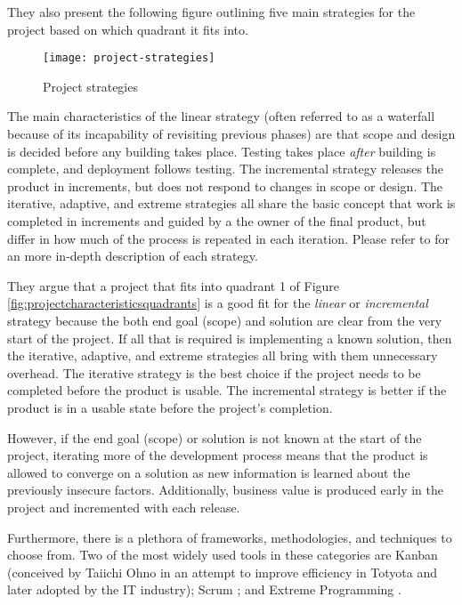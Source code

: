 They also present the following figure outlining five main strategies for the project based on which quadrant it fits into.

\begin{figure}[H]
    \label{fig:projectstrategies}
    \centerline{\texttt{[image: project-strategies]}}
    \caption{Project strategies}
\end{figure}

The main characteristics of the linear strategy (often referred to as a waterfall because of its incapability of revisiting previous phases) are that scope and design is decided before any building takes place. Testing takes place \emph{after} building is complete, and deployment follows testing. The incremental strategy releases the product in increments, but does not respond to changes in scope or design. The iterative, adaptive, and extreme strategies all share the basic concept that work is completed in increments and guided by a the owner of the final product, but differ in how much of the process is repeated in each iteration. Please refer to \autocite{fernandez:agilevstraditional} for an more in-depth description of each strategy.

They argue that a project that fits into quadrant 1 of Figure \ref{fig:projectcharacteristicsquadrants} is a good fit for the \emph{linear} or \emph{incremental} strategy because the both end goal (scope) and solution are clear from the very start of the project. If all that is required is implementing a known solution, then the iterative, adaptive, and extreme strategies all bring with them unnecessary overhead. The iterative strategy is the best choice if the project needs to be completed before the product is usable. The incremental strategy is better if the product is in a usable state before the project's completion.

However, if the end goal (scope) or solution is not known at the start of the project, iterating more of the development process means that the product is allowed to converge on a solution as new information is learned about the previously insecure factors. Additionally, business value is produced early in the project and incremented with each release.

Furthermore, there is a plethora of frameworks, methodologies, and techniques to choose from. Two of the most widely used tools in these categories are Kanban (conceived by Taiichi Ohno in an attempt to improve efficiency in Totyota and later adopted by the IT industry); Scrum \autocite{schwaber:scrum}; and Extreme Programming \autocite{beck:extreme}.

